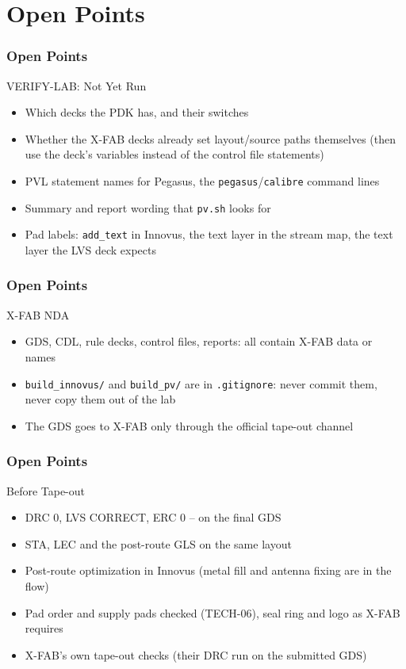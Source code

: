 \documentclass{beamer}
\newcommand{\astitle}{nix}
\newcommand{\assubtitle}{nix}
\newcommand{\cmd}[1]{\texttt{#1}}
\begin{document}
\section{Open Points}
\renewcommand{\astitle}{Open Points}

\renewcommand{\assubtitle}{VERIFY-LAB: Not Yet Run}
\begin{frame}
\frametitle{\astitle}
\begin{block}{\assubtitle}
  \begin{itemize}
    \item Which decks the PDK has, and their switches
    \item Whether the X-FAB decks already set layout/source paths
      themselves (then use the deck's variables instead of the control
      file statements)
    \item PVL statement names for Pegasus, the \cmd{pegasus}/\cmd{calibre}
      command lines
    \item Summary and report wording that \cmd{pv.sh} looks for
    \item Pad labels: \cmd{add\_text} in Innovus, the text layer in the
      stream map, the text layer the LVS deck expects
  \end{itemize}
\end{block}
\end{frame}

\renewcommand{\assubtitle}{X-FAB NDA}
\begin{frame}
\frametitle{\astitle}
\begin{block}{\assubtitle}
  \begin{itemize}
    \item GDS, CDL, rule decks, control files, reports: all contain X-FAB
      data or names
    \item \cmd{build\_innovus/} and \cmd{build\_pv/} are in
      \cmd{.gitignore}: never commit them, never copy them out of the lab
    \item The GDS goes to X-FAB only through the official tape-out
      channel
  \end{itemize}
\end{block}
\end{frame}

\renewcommand{\assubtitle}{Before Tape-out}
\begin{frame}
\frametitle{\astitle}
\begin{block}{\assubtitle}
  \begin{itemize}
    \item DRC 0, LVS CORRECT, ERC 0 -- on the final GDS
    \item STA, LEC and the post-route GLS on the same layout
    \item Post-route optimization in Innovus (metal fill and antenna
      fixing are in the flow)
    \item Pad order and supply pads checked (TECH-06), seal ring and
      logo as X-FAB requires
    \item X-FAB's own tape-out checks (their DRC run on the submitted GDS)
  \end{itemize}
\end{block}
\end{frame}
\end{document}

